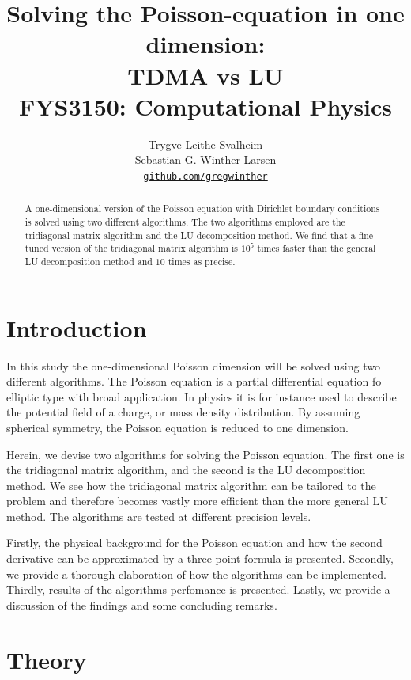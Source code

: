 \documentclass[10pt, a4paper]{amsart}
\title[Solving the Poisson-equation in one dimension]{Solving the Poisson-equation in one dimension: \\
\normalsize{TDMA vs LU} \\
  \hrulefill\small{ FYS3150: Computational Physics }\hrulefill}
\author[Svalheim \& Winther-Larsen]{Trygve Leithe Svalheim \\
   Sebastian G. Winther-Larsen \\
  \href{https://github.com/gregwinther/FYS3150/}{\texttt{github.com/gregwinther}}}
\begin{document}
\begin{titlepage}
\begin{abstract}
A one-dimensional version of the Poisson equation with Dirichlet boundary conditions is solved using two different algorithms. The two algorithms employed are the tridiagonal matrix algorithm and the LU decomposition method. We find that a fine-tuned version of the tridiagonal matrix algorithm is $10^5$ times faster than the general LU decomposition method and $10$ times as precise.
\end{abstract}
\maketitle
\tableofcontents
\end{titlepage}

\section{Introduction}
In this study the one-dimensional Poisson dimension will be solved using two different algorithms. The Poisson equation is a partial differential equation fo elliptic type with broad application. In physics it is for instance used to describe the potential field of a charge, or mass density distribution. By assuming spherical symmetry, the Poisson equation is reduced to one dimension.

Herein, we devise two algorithms for solving the Poisson equation. The first one is the tridiagonal matrix algorithm, and the second is the LU decomposition method. We see how the tridiagonal matrix algorithm can be tailored to the problem and therefore becomes vastly more efficient than the more general LU method. The algorithms are tested at different precision levels.

Firstly, the physical background for the Poisson equation and how the second derivative can be approximated by a three point formula is presented. Secondly, we provide a thorough elaboration of how the algorithms can be implemented. Thirdly, results of the algorithms perfomance is presented. Lastly, we provide a discussion of the findings and some concluding remarks.

\section{Theory}
\end{document}
